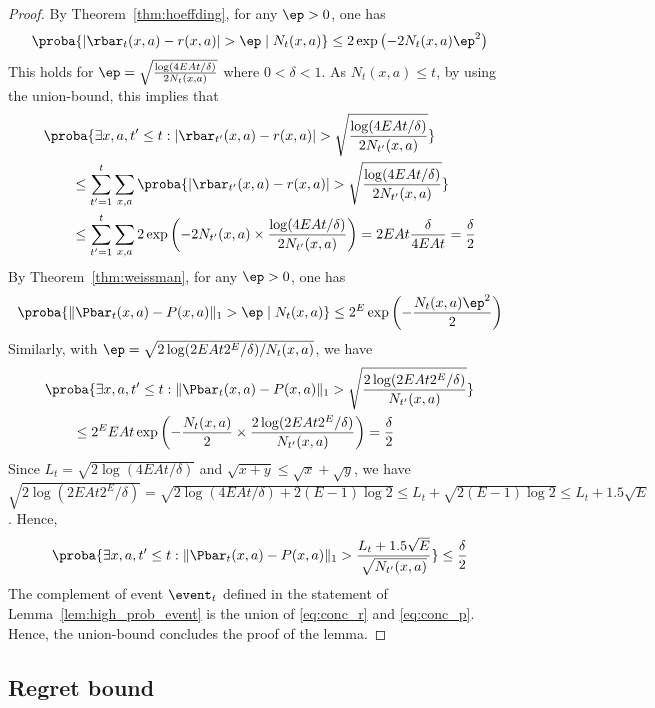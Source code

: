\begin{proof}
By Theorem~\ref{thm:hoeffding}, for any $\ep>0$, one has
\begin{align*}
\proba{\vert\rbar_{t}(x,a)-r(x,a)\vert>\ep \mid N_{t}(x,a)} \le 2\exp\left(-2N_{t}(x,a)\ep^2\right)
\end{align*}
This holds for $\ep=\sqrt{\frac{\log(4EAt/\delta)}{2N_t(x,a)}}$ where $0<\delta<1$.
As $N_t(x,a)\le t$, by using the union-bound, this implies that
\begin{align}
&\proba{\exists x,a, t'\le t: \vert\rbar_{t'}(x,a)-r(x,a)\vert>\sqrt{\frac{\log(4EAt/\delta)}{2N_{t'}(x,a)}}} \label{eq:conc_r}\\
&\qquad \le \sum_{t'=1}^{t}\sum_{x,a} \proba{\vert\rbar_{t'}(x,a)-r(x,a)\vert>\sqrt{\frac{\log(4EAt/\delta)}{2N_{t'}(x,a)}}} \nonumber \\
&\qquad \le \sum_{t'=1}^{t}\sum_{x,a} 2\exp\left(-2N_{t'}(x,a)\times\frac{\log(4EAt/\delta)}{2N_{t'}(x,a)}\right) =2EAt \frac{\delta}{4EAt}=\frac{\delta}2 \nonumber
\end{align}
By Theorem~\ref{thm:weissman}, for any $\ep>0$, one has
\begin{align*}
\proba{\Vert\Pbar_t(x,a)-P(x,a)\Vert_1 > \ep \mid N_t(x,a)} \le 2^E\exp\left(-\frac{N_t(x,a)\ep^2}{2}\right)
\end{align*}
Similarly, with $\ep=\sqrt{2\log(2EAt2^E/\delta)/N_t(x,a)}$, we have
\begin{align*}
&\proba{\exists x,a, t'\le t: \Vert\Pbar_t(x,a)-P(x,a)\Vert_1 >\sqrt{\frac{2\log(2EAt2^E/\delta)}{N_{t'}(x,a)}}} \\
&\qquad \le 2^EEAt\exp\left(-\frac{N_t(x,a)}{2}\times\frac{2\log(2EAt2^E/\delta)}{N_{t'}(x,a)}\right) =\frac{\delta}2
\end{align*}
Since $L_t=\sqrt{2\log(4EAt/\delta)}$ and $\sqrt{x+y}\le\sqrt{x}+\sqrt{y}$, we have $\sqrt{2\log(2EAt2^E/\delta)}=\sqrt{2\log(4EAt/\delta) +2(E-1)\log2}\le L_t + \sqrt{2(E-1)\log2} \le L_t +1.5\sqrt{E}$.
Hence,
\begin{align}
\label{eq:conc_p}
\proba{\exists x,a, t'\le t: \Vert\Pbar_t(x,a)-P(x,a)\Vert_1 >\frac{L_t+1.5\sqrt{E}}{\sqrt{N_{t'}(x,a)}}} \le \frac{\delta}2
\end{align}
The complement of event $\event_t$ defined in the statement of Lemma~\ref{lem:high_prob_event} is the union of \eqref{eq:conc_r} and \eqref{eq:conc_p}.
Hence, the union-bound concludes the proof of the lemma.
\end{proof}

\subsection{Regret bound}
\label{subsec:regret_ucrl2}


